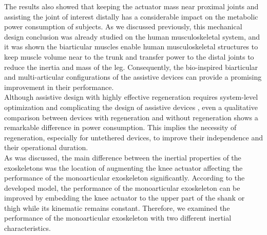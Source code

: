 \documentclass[10pt,letterpaper]{article}
\begin{document}
The results  also showed that keeping the actuator mass near proximal joints and assisting the joint of interest distally has a considerable impact on the metabolic power consumption of subjects. As we discussed previously, this mechanical design conclusion was already studied on the human musculoskeletal system, and it was shown the biarticular muscles enable human musculoskeletal structures to keep muscle volume near to the trunk and transfer power to the distal joints to reduce the inertia and mass of the leg. Consequently, the bio-inspired biarticular and multi-articular configurations of the assistive devices can provide a promising improvement in their performance.\\
Although assistive design with highly effective regeneration requires system-level optimization and complicating the design of assistive devices \cite{140}, even a qualitative comparison between devices with regeneration and without regeneration shows a remarkable difference in power consumption. This implies the necessity of regeneration, especially for untethered devices, to improve their independence and their operational duration.\\
As was discussed, the main difference between the inertial properties of the exoskeletons was the location of augmenting the knee actuator affecting the performance of the monoarticular exoskeleton significantly. According to the developed model, the performance of the monoarticular exoskeleton can be improved by embedding the knee actuator to the upper part of the shank or thigh while its kinematic remains constant. Therefore, we examined the performance of the monoarticular exoskeleton with two different inertial characteristics.\\
\end{document}
